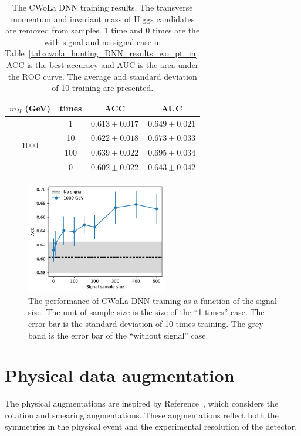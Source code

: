 \documentclass[12pt]{article}
\begin{document}
		\begin{table}[htpb]
			\centering
			\caption{The CWoLa DNN training results. The transverse momentum and invariant mass of Higgs candidates are removed from samples. 1 time and 0 times are the with signal and no signal case in Table~\ref{tab:cwola_hunting_DNN_results_wo_pt_m}. ACC is the best accuracy and AUC is the area under the ROC curve. The average and standard deviation of 10 training are presented.}
			\label{tab:cwola_hunting_DNN_results_wo_pt_m_enlarge_signal_size_deeper_model}
			\begin{tabular}{c|c|cc}
				$m_H$ (GeV)           & times & ACC               & AUC               \\ \hline
				\multirow{4}{*}{1000} & 1     & $0.613 \pm 0.017$ & $0.649 \pm 0.021$ \\
									  & 10    & $0.622 \pm 0.018$ & $0.673 \pm 0.033$ \\
									  & 100   & $0.639 \pm 0.022$ & $0.695 \pm 0.034$ \\
									  & 0     & $0.602 \pm 0.022$ & $0.643 \pm 0.042$
			\end{tabular}
		\end{table}
		\begin{figure}[htpb]
			\centering
			\includegraphics[width=0.55\textwidth]{ACC_vs_signal_sample_size_deeper_model-1000GeV.pdf}
			\caption{The performance of CWoLa DNN training as a function of the signal size. The unit of sample size is the size of the ``1 times'' case. The error bar is the standard deviation of 10 times training. The grey band is the error bar of the ``without signal'' case.}
			\label{fig:cwola_hunting_DNN_results_wo_pt_m_various_signal_size_deeper_model_1000GeV}
		\end{figure}
\section{Physical data augmentation}%
\label{sec:physical_data_augmentation}
	The physical augmentations are inspired by Reference~\cite{Dillon:2023zac}, which considers the rotation and smearing augmentations. These augmentations reflect both the symmetries in the physical event and the experimental resolution of the detector.
\end{document}
